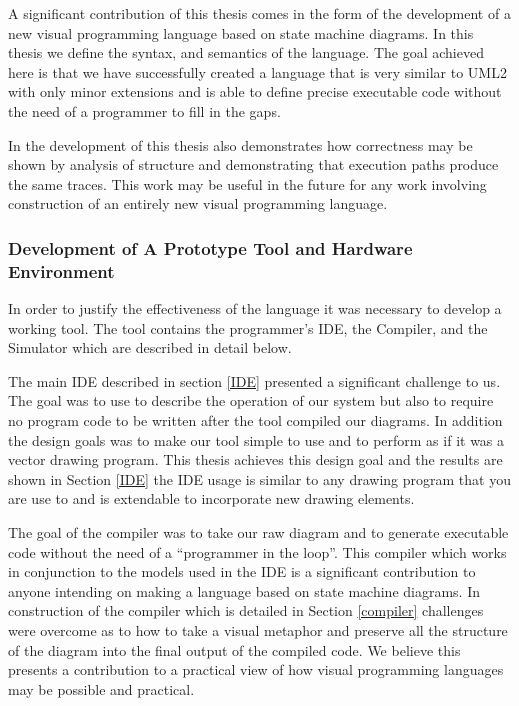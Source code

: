 A significant contribution of this thesis comes in the form of the development of 
\plccharts a new visual programming language based on state machine diagrams. 
In this thesis we define the syntax, and semantics of the language. The goal 
achieved here is that we have successfully created a language that is very 
similar to UML2 with only minor extensions and is able to define precise 
executable code without the need of a programmer to fill in the gaps.

In the development of \plccharts this thesis also demonstrates how correctness 
may be shown by analysis of structure and demonstrating that execution paths 
produce the same traces. This work may be useful in the future for any work 
involving construction of an entirely new visual programming language.


\subsubsection{Development of A Prototype Tool and Hardware Environment}
In order to justify the effectiveness of the \plccharts language it was necessary to develop a working tool. The tool contains the programmer's IDE, the Compiler, and the Simulator which are described in detail below.

The main IDE described in section \ref{IDE} presented a significant challenge to us. 
The goal was to use \plccharts to describe the operation of our system but also to 
require no program code to be written after the tool compiled our diagrams. In addition 
the design goals was to make our tool simple to use and to perform as if it was a 
vector drawing program. This thesis achieves this design goal and the results are 
shown in Section \ref{IDE} the IDE usage is similar to any drawing program that 
you are use to and is extendable to incorporate new drawing elements.

The goal of the compiler was to take our raw diagram and to generate executable code without the need of a ``programmer in the loop''. This compiler which works in conjunction to the models used in the IDE is a significant contribution to anyone intending on making a language based on state machine diagrams. In construction of the compiler which is detailed in Section \ref{compiler} challenges were overcome as to how to take a visual metaphor and preserve all the structure of the diagram into the final output of the compiled code. We believe this presents a contribution to a practical view of how visual programming languages may be possible and practical.

